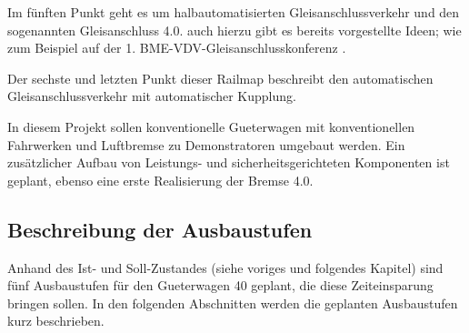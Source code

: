 Im fünften Punkt geht es um halbautomatisierten Gleisanschlussverkehr und den sogenannten Gleisanschluss 4.0. auch hierzu gibt es bereits vorgestellte Ideen; wie zum Beispiel auf der 1. BME-VDV-Gleisanschlusskonferenz \cite{GAK}. \par
Der sechste und letzten Punkt dieser Railmap beschreibt den automatischen Gleisanschlussverkehr mit automatischer Kupplung.\par
In diesem Projekt sollen konventionelle \gls{Gueterwagen} mit konventionellen Fahrwerken und Luftbremse zu \gls{Demonstrator}en umgebaut werden. Ein zusätzlicher Aufbau von Leistungs- und sicherheitsgerichteten Komponenten ist geplant, ebenso eine erste Realisierung der \gls{Bremse 4.0}\cite{Stephenson, ETR_2}.\par

\subsection{Beschreibung der Ausbaustufen}\label{sec:Ausbaustufen}
Anhand des Ist- und Soll-Zustandes (siehe voriges und folgendes Kapitel) sind fünf Ausbaustufen für den \gls{Gueterwagen 40} geplant, die diese Zeiteinsparung bringen sollen. In den folgenden Abschnitten werden die geplanten Ausbaustufen kurz beschrieben.\par

